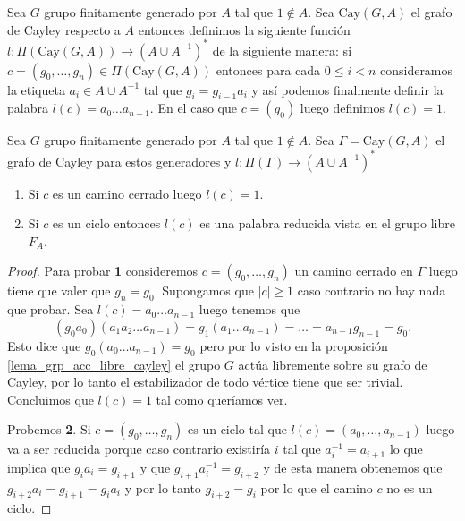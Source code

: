 \documentclass[tesis.tex]{subfiles}
\begin{document}
\begin{deff}
	Sea $G$ grupo finitamente generado por $A$ tal que $1 \notin A$.
	Sea $\text{Cay}(G,A)$ el grafo de Cayley respecto a $A$ entonces definimos la siguiente función 
	$l: \Pi(\text{Cay}(G,A)) \to (A \cup A^{-1})^*$
	de la siguiente manera:
	si $c = (g_{0}, \dots, g_{n}) \in \Pi(\text{Cay}(G,A))$ entonces para cada $0 \le i < n$ consideramos la etiqueta $a_{i} \in A \cup A^{-1}$ tal que $g_{i} = g_{i-1}a_{i}$ y así podemos finalmente definir la palabra $l(c) = a_{0}\dots a_{n-1}$.
	En el caso que $c = (g_{0})$ luego definimos $l(c) = 1$. 
\end{deff}
\begin{lema}\label{obs_grafo_Cayley_palabras}
	Sea $G$ grupo finitamente generado por $A$ tal que $1 \notin A$.
	Sea $\Gamma = \text{Cay}(G,A)$ el grafo de Cayley para estos generadores y $l: \Pi(\Gamma) \to (A \cup A^{-1})^*$ 
	\begin{enumerate}
		\item Si $c$ es un camino cerrado luego $l(c) = 1$.
		
		\item Si $c$ es un ciclo entonces $l(c)$ es una palabra reducida vista en el grupo libre $F_{A}$.
	\end{enumerate}
\end{lema}

\begin{proof}
	Para probar \textbf{1} consideremos $c = (g_{0}, \dots, g_{n})$ un camino cerrado en $\Gamma$ luego tiene que valer que $g_{n} = g_{0}$.
	Supongamos que $|c| \ge 1$ caso contrario no hay nada que probar.
	Sea $l(c) = a_{0} \dots a_{n-1}$ luego tenemos que 
	\[
		(g_{0}a_{0})(a_{1}a_{2} \dots a_{n-1}) = g_{1}(a_{1} \dots a_{n-1}) = \dots = a_{n-1}g_{n-1} =  g_{0}.
	\] 
	Esto dice que $g_{0}(a_{0} \dots a_{n-1}) = g_{0}$ pero por lo visto en la proposición \ref{lema_grp_acc_libre_cayley} el grupo $G$ actúa libremente sobre su grafo de Cayley, por lo tanto el estabilizador de todo vértice tiene que ser trivial.
	Concluimos que $l(c) = 1$ tal como queríamos ver.
	
	Probemos \textbf{2}.
	Si $c = (g_{0}, \dots, g_{n})$ es un ciclo tal que $l(c) = (a_{0}, \dots, a_{n-1})$ luego va a ser reducida porque caso contrario existiría $i$ tal que $a_{i}^{-1} = a_{i+1}$ lo que implica que $g_{i}a_{i} = g_{i+1}$ y que $g_{i+1}a_{i}^{-1} = g_{i+2}$ y de esta manera obtenemos que $g_{i+2}a_{i} = g_{i+1} = g_{i}a_{i}$ y por lo tanto $g_{i+2} = g_{i}$ por lo que el camino $c$ no es un ciclo.
	
\end{proof}
\end{document}
